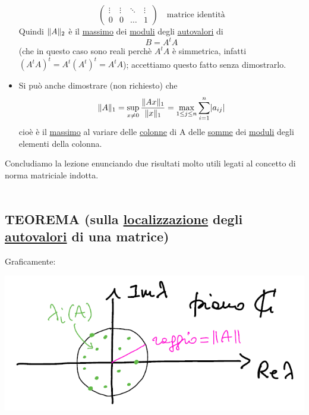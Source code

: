 \documentclass[12pt,a4paper]{article}
\DeclarePairedDelimiter{\abs}{\lvert}{\rvert}
\DeclarePairedDelimiter{\norma}{\lVert}{\rVert}
\begin{document}
\begin{itemize}
\[\begin{pmatrix}
        \vdots & \vdots & \ddots & \vdots \\
        0 & 0 & \dotso & 1
    \end{pmatrix} \quad \text{matrice identità}\]
    Quindi $\norma{A}_2$ è il \uline{massimo} dei \uline{moduli} degli \uline{autovalori} di \[B = A^t A\]
    (che in questo caso sono reali perchè $A^t A$ è simmetrica,
    infatti $(A^t A)^t = A^t(A^t)^t = A^t A$); accettiamo questo fatto senza dimostrarlo. \\
    \item Si può anche dimostrare (non richiesto) che
    \[\norma{A}_1 = \sup_{x \ne 0} \frac{\norma{Ax}_1}{\norma{x}_1} = \max_{1 \le j \le n} \sum_{i=1}^n \abs{a_{ij}}\]
    cioè è il \uline{massimo} al variare delle \uline{colonne} di A delle \uline{somme} dei \uline{moduli} degli elementi della colonna.
\end{itemize}

\bigskip
Concludiamo la lezione enunciando due risultati molto utili legati al concetto di norma matriciale indotta.\\\\

\subsection{TEOREMA (sulla \uline{localizzazione} degli \uline{autovalori} di una matrice)}
\begin{center}
\end{center}
Graficamente:
\begin{center}
    \includegraphics[scale=0.5]{lez19_img2.png}    
\end{center}
\end{document}
